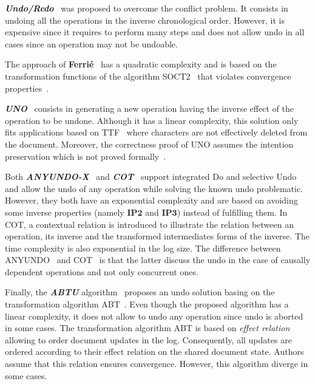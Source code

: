 \documentclass[submission,copyright,creativecommons]{eptcs}
\begin{document}
\emph{\textbf{Undo/Redo}}~\cite{Ressel99} was proposed to overcome the conflict problem. It consists in undoing all the operations in the inverse chronological
order.
However, it is expensive since it requires to perform many steps and does
not allow undo in all cases since an operation may  not be undoable.


The approach of \textbf{Ferri\'e}~\cite{Ferrie04}   has a quadratic complexity and is based on  the transformation functions of the algorithm SOCT2~\cite{suleiman97} that violates convergence properties~\cite{ImineMOR03, Imi06}.


\textbf{\emph{UNO}}~\cite{WEISS:2008} consists in generating a new operation having the inverse effect of the operation to be undone. Although it has a linear complexity,   this solution only fits applications based on TTF~\cite{Oster06}   where characters are not effectively deleted from the document. Moreover,   the correctness proof of UNO assumes the intention preservation which is not proved formally~\cite{BinShao10}.




Both \textbf{\emph{ANYUNDO-X}}~\cite{Sun02}  and \textbf{\emph{COT}}~\cite{SunS09} support integrated Do and selective Undo and allow the undo
of any operation while solving the known undo problematic. However, they both have an exponential complexity and are based on avoiding some  inverse properties (namely $\mathbf{IP2}$ and $\mathbf{IP3}$) instead of fulfilling them.
In COT, a contextual relation is introduced to illustrate the relation between an operation, its inverse and the transformed intermediates forms of the inverse. The time complexity is also exponential in the log size.
The difference between ANYUNDO~\cite{Sun02} and COT~\cite{SunS09} is that the latter discuss the undo in the case of causally dependent operations and not only concurrent ones. 

Finally, the \textbf{\emph{ABTU}} algorithm~\cite{BinShao10}   proposes an undo solution     basing on the transformation algorithm ABT~\cite{LiLi10}.
Even though the proposed algorithm has a linear complexity, it  does not allow to undo any operation since undo is aborted in some cases.
The transformation algorithm ABT is based on   \textit{effect relation} allowing to order document updates in the log. Consequently, all updates are ordered according to their effect relation on the shared document state.
 Authors assume that this relation ensures convergence. However, this algorithm diverge in some cases.
\end{document}
